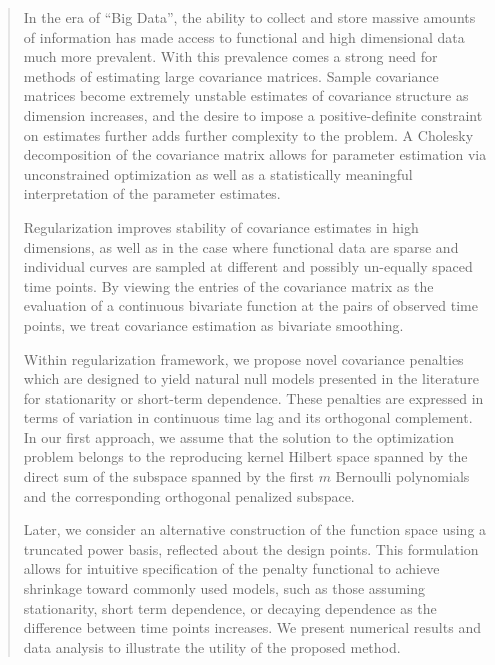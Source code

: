 


\begin{quote}
In the era of ``Big Data'', the ability to collect and store massive amounts of information has made access to functional and high dimensional data much more prevalent. With this prevalence comes a strong need for methods of estimating large covariance matrices. Sample covariance matrices become extremely unstable estimates of covariance structure as  dimension increases, and the desire to impose a positive-definite constraint on estimates further adds further complexity to the problem. A Cholesky decomposition of the covariance matrix allows for parameter estimation via unconstrained optimization as well as a statistically meaningful interpretation of the parameter estimates. 

Regularization improves stability of covariance estimates in high dimensions, as well as in the case where functional data are sparse and individual curves are sampled at different and possibly un-equally spaced time points. By viewing the entries of the covariance matrix as the evaluation of a continuous bivariate function at the pairs of observed time points, we treat covariance estimation as bivariate smoothing. 

Within regularization framework, we propose novel covariance penalties which are designed to yield natural null models presented in the literature for stationarity or short-term dependence. These penalties are expressed in terms of variation in continuous time lag and its orthogonal complement. In our first approach, we assume that the solution to the optimization problem belongs to the reproducing kernel Hilbert space spanned by the direct sum of the subspace spanned by the first $m$ Bernoulli polynomials and the corresponding orthogonal penalized subspace.

Later, we consider an alternative construction of the function space using a truncated power basis, reflected about the design points. This formulation allows for intuitive specification of the penalty functional to achieve shrinkage toward commonly used models, such as those assuming stationarity, short term dependence, or decaying dependence as the difference between time points increases. We present numerical results and data analysis to illustrate the utility of the proposed method.

\end{quote}
